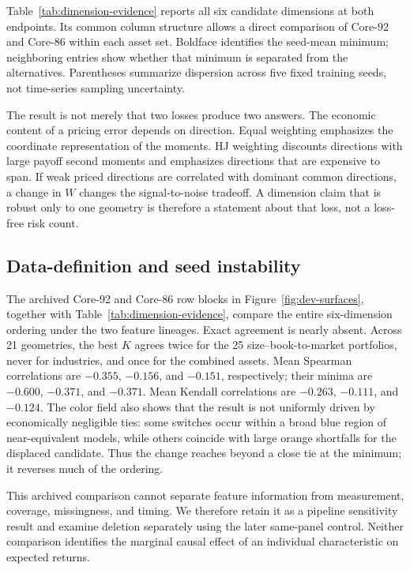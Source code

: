 Table~\ref{tab:dimension-evidence} reports all six candidate dimensions at both endpoints. Its common column structure allows a direct comparison of Core-92 and Core-86 within each asset set. Boldface identifies the seed-mean minimum; neighboring entries show whether that minimum is separated from the alternatives. Parentheses summarize dispersion across five fixed training seeds, not time-series sampling uncertainty.



The result is not merely that two losses produce two answers. The economic content of a pricing error depends on direction. Equal weighting emphasizes the coordinate representation of the moments. HJ weighting discounts directions with large payoff second moments and emphasizes directions that are expensive to span. If weak priced directions are correlated with dominant common directions, a change in $W$ changes the signal-to-noise tradeoff. A dimension claim that is robust only to one geometry is therefore a statement about that loss, not a loss-free risk count.

\subsection{Data-definition and seed instability}

The archived Core-92 and Core-86 row blocks in Figure~\ref{fig:dev-surfaces}, together with Table~\ref{tab:dimension-evidence}, compare the entire six-dimension ordering under the two feature lineages. Exact agreement is nearly absent. Across 21 geometries, the best $K$ agrees twice for the 25 size--book-to-market portfolios, never for industries, and once for the combined assets. Mean Spearman correlations are $-0.355$, $-0.156$, and $-0.151$, respectively; their minima are $-0.600$, $-0.371$, and $-0.371$. Mean Kendall correlations are $-0.263$, $-0.111$, and $-0.124$. The color field also shows that the result is not uniformly driven by economically negligible ties: some switches occur within a broad blue region of near-equivalent models, while others coincide with large orange shortfalls for the displaced candidate. Thus the change reaches beyond a close tie at the minimum; it reverses much of the ordering.

This archived comparison cannot separate feature information from measurement, coverage, missingness, and timing. We therefore retain it as a pipeline sensitivity result and examine deletion separately using the later same-panel control. Neither comparison identifies the marginal causal effect of an individual characteristic on expected returns.

